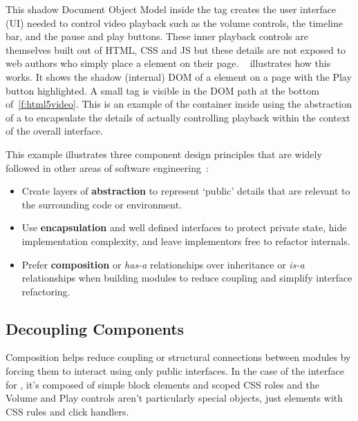 This shadow Document Object Model inside the 
 tag creates the user interface (UI) needed to control video playback such as the volume controls, the timeline bar, and the pause and play buttons.
These inner playback controls are themselves built out of HTML, CSS and JS but these details are not exposed to web authors who simply place a  element on their page. 
~ illustrates how this works. It shows the shadow (internal) DOM of a  element on a page with the Play button  highlighted.
A small  tag is visible in the DOM path at the bottom of~\cref{f:html5video}.
This is an example of the container inside  using the abstraction of a  to encapsulate the details of actually controlling playback within the context of the overall  interface.

This example illustrates three component design principles that are widely followed in other areas of software engineering~\cite{fowler2012}:
\begin{itemize}
\item Create layers of \textbf{abstraction} to represent `public' details that are relevant to the surrounding code or environment.
\item Use \textbf{encapsulation} and well defined interfaces to protect private state, hide implementation complexity, and leave implementors free to refactor internals.
\item Prefer \textbf{composition} or \textit{has-a} relationships over inheritance or \textit{is-a} relationships when building modules to reduce coupling and simplify interface refactoring.
\end{itemize}

\subsection{Decoupling Components}
Composition helps reduce coupling or structural connections between modules by forcing them to interact using only public interfaces.
In the case of the interface for , it's composed of simple block elements and scoped CSS roles and the Volume and Play controls aren't particularly special objects, just  elements with CSS rules and click handlers.

